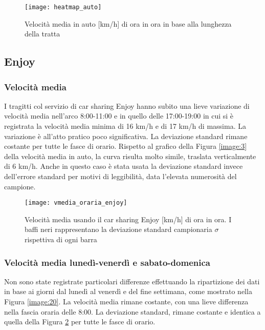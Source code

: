 \begin{figure}[H]
	\centering
	\texttt{[image: heatmap\_auto]}
	\caption{Velocità media in auto [km/h] di ora in ora in base alla lunghezza della tratta}
	\label{image:6}
\end{figure}

\pagebreak

\subsection{Enjoy}

\subsubsection{Velocità media}

I tragitti col servizio di car sharing Enjoy hanno subito una lieve variazione di velocità media nell'arco 8:00-11:00 e in quello delle 17:00-19:00 in cui si è registrata la velocità media minima di 16 km/h e di 17 km/h di massima. La variazione è all'atto pratico poco significativa. La deviazione standard rimane costante per tutte le fasce di orario. Rispetto al grafico della Figura \ref{image:3} della velocità media in auto, la curva risulta molto simile, traslata verticalmente di 6 km/h. Anche in questo caso è stata usata la deviazione standard invece dell'errore standard per motivi di leggibilità, data l'elevata numerosità del campione.

\begin{figure}[H]
	\centering
	\texttt{[image: vmedia\_oraria\_enjoy]}
	\caption{Velocità media usando il car sharing Enjoy [km/h] di ora in ora.  I baffi neri rappresentano la deviazione standard campionaria $\sigma$ rispettiva di ogni barra}
	\label{image:7}
\end{figure}

\subsubsection{Velocità media lunedì-venerdì e sabato-domenica}

Non sono state registrate particolari differenze effettuando la ripartizione dei dati in base ai giorni dal lunedì al venerdì e del fine settimana, come mostrato nella Figura \ref{image:20}. La velocità media rimane costante, con una lieve differenza nella fascia oraria delle 8:00. La deviazione standard, rimane costante e identica a quella della Figura \ref{image:7} per tutte le fasce di orario.

